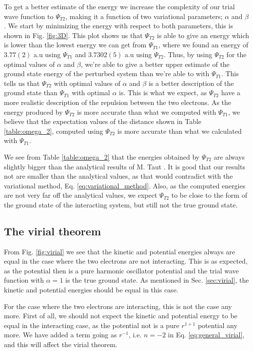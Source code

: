 \documentclass[%
 reprint,
nofootinbib,
aps,
]{revtex4-1}
\begin{document}
To get a better estimate of the energy we increase the complexity of our trial wave function to $\Psi_{T2}$, making it a function of two variational parameters; $\alpha$ and $\beta$. We start by minimizing the energy with respect to both parameters, this is shown in Fig. \vref{fig:3D}. This plot shows us that $\Psi_{T2}$ is able to give an energy which is lower than the lowest energy we can get from $\Psi_{T1}$, where we found an energy of $3.77(2)$ a.u using $\Psi_{T1}$ and $3.7302(5)$ a.u using $\Psi_{T2}$. Thus, by using $\Psi_{T2}$ for the optimal values of $\alpha$ and $\beta$, we're able to give a better upper estimate of the ground state energy of the perturbed system than we're able to with $\Psi_{T1}$.
This tells us that $\Psi_{T2}$ with optimal values of $\alpha$ and $\beta$ is a better description of the ground state than $\Psi_{T1}$ with optimal $\alpha$ is. This is what we expect, as $\Psi_{T2}$ have a more realistic description of the repulsion between the two electrons.
As the energy produced by $\Psi_{T2}$ is more accurate than what we computed with $\Psi_{T1}$, we believe that the expectation values of the distance shown in Table \vref{table:omega_2}, computed using $\Psi_{T2}$ is more accurate than what we calculated with $\Psi_{T1}$.

We see from Table \ref{table:omega_2} that the energies obtained by $\Psi_{T2}$ are always slightly bigger than the analytical results of M. Taut \citep{taut}. It is good that our results not are smaller than the analytical values, as that would contradict with the variational method, Eq. \eqref{eq:variational_method}. Also, as the computed energies are not very far off the analytical values, we expect $\Psi_{T2}$ to be close to the form of the ground state of the interacting system, but still not the true ground state.

\subsection{The virial theorem}

From Fig. \ref{fig:virial} we see that the kinetic and potential energies always are equal in the case where the two electrons are not interacting. This is as expected, as the potential then is a pure harmonic oscillator potential and the trial wave function with $\alpha = 1$ is the true ground state. As mentioned in Sec. \ref{sec:virial}, the kinetic and potential energies should be equal in this case.

For the case where the two electrons are interacting, this is not the case any more. First of all, we should not expect the kinetic and potential energy to be equal in the interacting case, as the potential not is a pure $r^{1+1}$ potential any more. We have added a term going as $r^{-1}$, i.e. $n = -2$ in Eq. \ref{eq:general_virial}, and this will affect the virial theorem.
\end{document}

